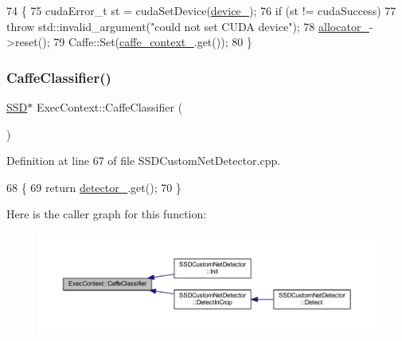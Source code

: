 \begin{DoxyCode}
74     \{
75         cudaError\_t st = cudaSetDevice(\mbox{\hyperlink{class_exec_context_a05d01fbf5236f59519a9708580c175da}{device\_}});
76         \textcolor{keywordflow}{if} (st != cudaSuccess)
77             \textcolor{keywordflow}{throw} std::invalid\_argument(\textcolor{stringliteral}{"could not set CUDA device"});
78         \mbox{\hyperlink{class_exec_context_aa91ffaae541ca563b5aabb2f2a1c53b5}{allocator\_}}->reset();
79         Caffe::Set(\mbox{\hyperlink{class_exec_context_a6561f67a969e8b38001d488e4937515f}{caffe\_context\_}}.get());
80     \}
\end{DoxyCode}
\mbox{\label{class_exec_context_a6c596880b2a6a4c8df7e8ca639f2a1b7}} 
\subsubsection{\texorpdfstring{Caffe\+Classifier()}{CaffeClassifier()}}
{\footnotesize\ttfamily \mbox{\hyperlink{class_s_s_d}{S\+SD}}$\ast$ Exec\+Context\+::\+Caffe\+Classifier (\begin{DoxyParamCaption}{ }\end{DoxyParamCaption})\hspace{0.3cm}{\ttfamily [inline]}}



Definition at line 67 of file S\+S\+D\+Custom\+Net\+Detector.\+cpp.


\begin{DoxyCode}
68     \{
69         \textcolor{keywordflow}{return} \mbox{\hyperlink{class_exec_context_acfecd6b6e282a7b7c67451dedd8bacae}{detector\_}}.get();
70     \}
\end{DoxyCode}
Here is the caller graph for this function\+:\nopagebreak
\begin{figure}[H]
\begin{center}
\leavevmode
\includegraphics[width=350pt]{class_exec_context_a6c596880b2a6a4c8df7e8ca639f2a1b7_icgraph}
\end{center}
\end{figure}
\mbox{\label{class_exec_context_a91a52dd30a857c8e71ea98976a9d44c2}} 
